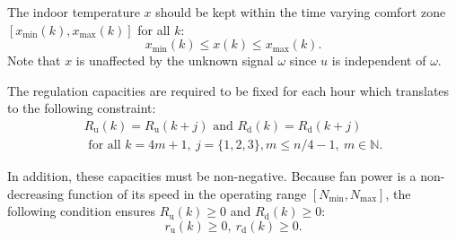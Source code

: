 The indoor temperature $x$ should be kept within the time varying comfort zone $[x_{\text{min}}(k), x_{\text{max}}(k)]$ for all $k$:
\begin{equation}
x_{\text{min}}(k) \leq x(k) \leq x_{\text{max}}(k).
\end{equation}
Note that $x$ is unaffected by the unknown signal $\omega$ since $u$ is independent of $\omega$.



The regulation capacities are required to be fixed for each hour which translates to the following constraint:
\begin{multline}\label{eq:R_constraint_const}
R_{\text{u}}(k) = R_{\text{u}}(k+j) \text{~and~} R_{\text{d}}(k) = R_{\text{d}}(k+j)\\
\text{~for all~} k = 4m+1,~ j = \{1,2,3\}, m \leq n/4-1, ~m \in \mathbb{N}.
\end{multline}

\noindent In addition, these capacities must be non-negative.
Because fan power is a non-decreasing function of its speed in the operating range $[N_\text{min}, N_\text{max}]$, the following condition ensures $R_{\text{u}}(k) \geq 0$ and $R_{\text{d}}(k) \geq 0$:
\begin{equation}\label{eq:r_constraint} 
r_{\text{u}}(k) \geq 0, ~r_{\text{d}}(k) \geq 0.
\end{equation}


